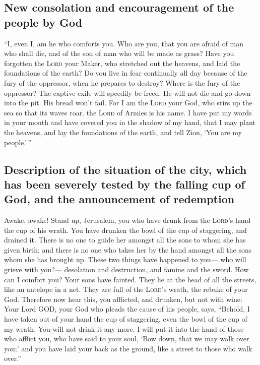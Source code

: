 \hypertarget{new-consolation-and-encouragement-of-the-people-by-god}{%
\subsection{New consolation and encouragement of the people by
God}\label{new-consolation-and-encouragement-of-the-people-by-god}}

 ``I, even I, am he who comforts you. Who are you, that
you are afraid of man who shall die, and of the son of man who will be
made as grass?  Have you forgotten the \textsc{Lord} your
Maker, who stretched out the heavens, and laid the foundations of the
earth? Do you live in fear continually all day because of the fury of
the oppressor, when he prepares to destroy? Where is the fury of the
oppressor?  The captive exile will speedily be freed. He
will not die and go down into the pit. His bread won't fail.
 For I am the \textsc{Lord} your God, who stirs up the
sea so that its waves roar. the \textsc{Lord} of Armies is his name.
 I have put my words in your mouth and have covered you
in the shadow of my hand, that I may plant the heavens, and lay the
foundations of the earth, and tell Zion, `You are my people.'\,''

\hypertarget{description-of-the-situation-of-the-city-which-has-been-severely-tested-by-the-falling-cup-of-god-and-the-announcement-of-redemption}{%
\subsection{Description of the situation of the city, which has been
severely tested by the falling cup of God, and the announcement of
redemption}\label{description-of-the-situation-of-the-city-which-has-been-severely-tested-by-the-falling-cup-of-god-and-the-announcement-of-redemption}}

 Awake, awake! Stand up, Jerusalem, you who have drunk
from the \textsc{Lord}'s hand the cup of his wrath. You have drunken the
bowl of the cup of staggering, and drained it.  There is
no one to guide her amongst all the sons to whom she has given birth;
and there is no one who takes her by the hand amongst all the sons whom
she has brought up.  These two things have happened to
you--- who will grieve with you?--- desolation and destruction, and
famine and the sword. How can I comfort you?  Your sons
have fainted. They lie at the head of all the streets, like an antelope
in a net. They are full of the \textsc{Lord}'s wrath, the rebuke of your
God.  Therefore now hear this, you afflicted, and
drunken, but not with wine:  Your Lord GOD, your God who
pleads the cause of his people, says, ``Behold, I have taken out of your
hand the cup of staggering, even the bowl of the cup of my wrath. You
will not drink it any more.  I will put it into the hand
of those who afflict you, who have said to your soul, `Bow down, that we
may walk over you;' and you have laid your back as the ground, like a
street to those who walk over.''

